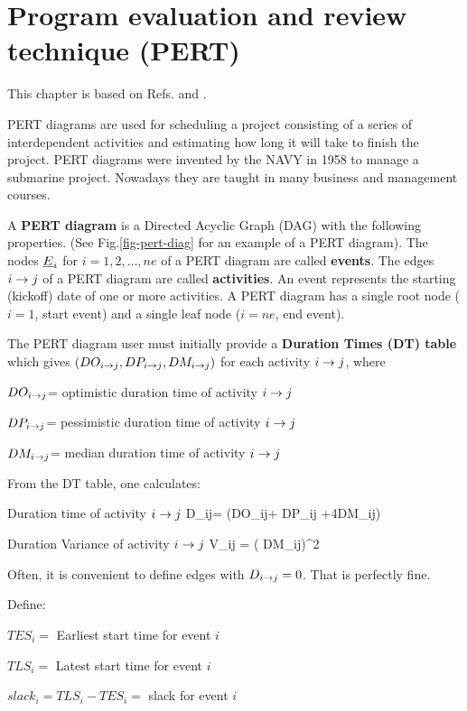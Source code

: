 \chapter{Program evaluation
 and review technique (PERT)}
This chapter is based on
Refs.\cite{ibook} and \cite{wiki-pert}.

PERT diagrams are 
used for scheduling a 
project consisting of a series
of interdependent activities
and estimating how
long it will take
to finish the project.
PERT diagrams were invented by the NAVY 
in 1958
to manage a submarine project.
Nowadays they are taught in many business 
and management courses.

A {\bf PERT diagram}
is a  Directed Acyclic Graph (DAG)
with the following properties. 
(See Fig.\ref{fig-pert-diag}
for an example of a PERT diagram).
The nodes $\rvE_i$ for $i=1, 2, \ldots, ne$ of a
PERT diagram are called {\bf events}.
 The edges $i\rightarrow j$ of a PERT diagram are called
 {\bf activities}.
An event represents the starting 
(kickoff) date of one or more
activities.
A PERT diagram has a 
single root node ($i=1$, start event)
and a single leaf node ($i=ne$, end event).

The PERT diagram user 
must initially 
provide a
{\bf Duration Times (DT) table} which gives $(DO_{i\rightarrow j}, 
DP_{i\rightarrow j}, DM_{i\rightarrow j})$ for each activity
$i\rightarrow j$, where

$DO_{i\rightarrow j}$= optimistic duration time 
of activity $i\rightarrow j$

$DP_{i\rightarrow j}$= pessimistic duration time 
of activity $i\rightarrow j$

$DM_{i\rightarrow j}$= median duration time 
of activity $i\rightarrow j$

From the DT table, one calculates:

Duration time of activity $i\rightarrow j$ 
\beq
D_{i\rarrow j}= (DO_{i\rarrow j}+
DP_{i\rarrow j} +4DM_{i\rarrow j})
\eeq

Duration Variance of activity $i\rightarrow j$
\beq
V_{i\rarrow j} = \left(
{DM_{i\rarrow j}}\right)^2
\eeq

Often,
it is convenient to define
 edges with $D_{i\rightarrow j}=0$.
That is perfectly fine.

Define:

$TES_i=$ Earliest start time for event $i$

$TLS_i=$ Latest start time for event $i$

$slack_i=TLS_i-TES_i=$ slack for event $i$


